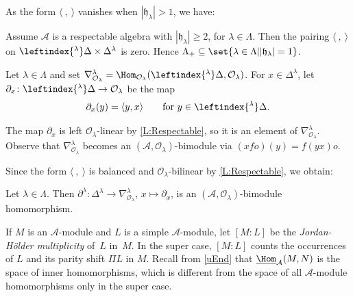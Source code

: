\documentclass[a4paper,11pt]{amsart}
\newcommand{\uHom}{\underline{\Hom}}
\let\<\langle
\let\>\rangle
\numberwithin{equation}{subsection}
\theoremstyle{definition}
\theoremstyle{theorem}
\theoremstyle{remark}
\newcommand\CA{\mathcal{A}}
\newcommand\CO{\mathcal{O}}
\newcommand\hlam[1][\lambda]{\mathfrak{h}_{#1}}
\newcommand\Olam[1][\lambda]{\CO_{#1}}
\begin{document}
  As the form $\<\ ,\ \>$ vanishes when $|\hlam|>1$, we have:

  \begin{Corollary}
    \label{C:hlarge2}
    Assume $\CA$ is a respectable algebra with $|\hlam|\ge2$, for
    $\lambda\in\Lambda$. Then the pairing $\<\ ,\ \>$ on $\leftindex{^\lambda}\Delta\times\Delta^\lambda$ is zero.
    Hence $\Lambda_+\subseteq\set{\lambda\in\Lambda|{|\hlam|}=1}$.
  \end{Corollary}

  \begin{Definition}\label{D:partialx}
    Let $\lambda\in\Lambda$ and set
    $\nabla^\lambda_{\Olam}=\Hom_{\Olam}(\leftindex{^\lambda}\Delta,\Olam)$.
    For $x\in\Delta^\lambda$, let $\partial_x\colon\leftindex{^\lambda}\Delta\to\Olam$ be the map
    \[
        \partial_x(y)=\<y,x\>\qquad\text{for }y\in\leftindex{^\lambda}\Delta.
    \]
  \end{Definition}

  The map $\partial_x$ is left $\Olam$-linear by
  \autoref{L:Respectable}, so it is an element of
  $\nabla^\lambda_{\Olam}$. Observe that $\nabla^\lambda_{\Olam}$ becomes an $(\CA,\Olam)$-bimodule via $(xfo)(y)=f(yx)o$.

  Since the form $\<\ ,\ \>$ is balanced and $\Olam$-bilinear by \autoref{L:Respectable}, we obtain:

  \begin{Corollary}\label{Ahom}
    Let $\lambda\in\Lambda$. Then
    $\partial^\lambda\colon\Delta^\lambda\to\nabla^\lambda_{\Olam}$, $x\mapsto\partial_x$, is an
    $(\CA,\Olam)$-bimodule homomorphism.
  \end{Corollary}


   If $M$ is an $\CA$-module and $L$ is a simple
   $\CA$-module, let $[M:L]$ be the \emph{Jordan-H\"older
   multiplicity} of~$L$ in~$M$.  In the super case, $[M: L]$ counts the
   occurrences of $L$ and its parity shift $\Pi L$ in $M$. Recall from
   \autoref{uEnd} that $\uHom_{\CA}(M,N)$ is the space of inner
   homomorphisms, which is different from the space of all
   $\CA$-module homomorphisms only in the super case.
\end{document}
